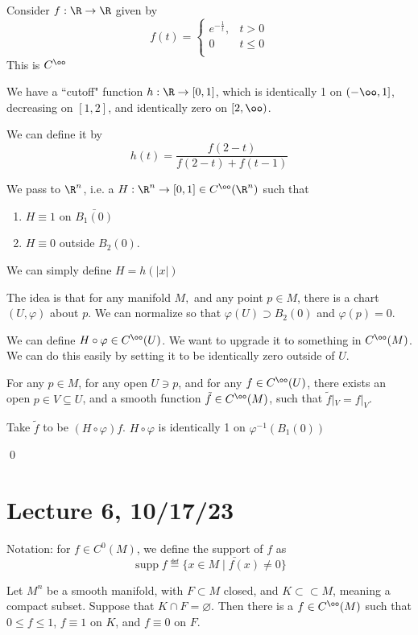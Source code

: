 \documentclass[x11names,reqno,14pt]{extarticle}
\renewcommand{\phi}{\varphi}
\DeclareMathOperator{\supp}{supp}
\begin{document}
Consider $f:\R\to\R$ given by 
\[
f(t) = \begin{cases} e^{-\frac{1}{t}}, & t > 0 \\ 0 & t \leq 0 \\ \end{cases}
\]
This is $C^\oo$

We have a ``cutoff" function $h:\R\to[0,1]$, which is identically 1 on $(-\oo, 1]$, decreasing on $[1,2]$, and identically zero on 
$[2,\oo)$. 

We can define it by 
\[
h(t) = \frac{f(2 - t)}{f(2 - t) + f(t - 1)}
\]

We pass to $\R^n$, i.e. a $H:\R^n\to[0,1]\in C^\oo(\R^n)$ such that
\begin{enumerate}

\item $H \equiv 1$ on $\bar{B_1(0)}$ 

\item $H \equiv 0$ outside $B_2(0)$. 

\end{enumerate}

We can simply define $H = h(|x|)$

The idea is that for any manifold $M,$ and any point $p\in M$, there is a chart $(U,\phi)$ about $p$. We can normalize so that $\phi(U) \supset B_2(0)$ and $\phi(p) = 0$. 

We can define $H\circ\phi\in C^\oo(U)$. We want to upgrade it to something in $C^\oo(M)$. We can do this easily by setting it to be identically zero outside of $U$.

\cor

For any $p \in M$, for any open $U \ni p$, and for any $f \in C^\oo(U)$, there exists an open $p \in V \subseteq U$, and a smooth function $\tilde{f}\in C^\oo(M)$, such that $\tilde{f}|_V = f|_V$.

\proof

Take $\tilde{f}$ to be $(H\circ\phi)f$. $H\circ\phi$ is identically 1 on $\phi^{-1}(B_1(0))$

\qed

\section*{Lecture 6, 10/17/23}

Notation: for $f \in C^0(M)$, we define the support of $f$ as 
\[
\supp f \eqdef \bar{\{x\in M \mid f(x) \neq 0\}}
\]

\thm

Let $M^n$ be a smooth manifold, with $F \subset M$ closed, and $K \subset\subset M$, meaning a compact subset. Suppose that $K \cap F = \varnothing$. Then there is a $f\in C^\oo(M)$ such that $0\leq f\leq1$, $f\equiv1$ on $K$, and $f\equiv0$ on $F$.
\end{document}
